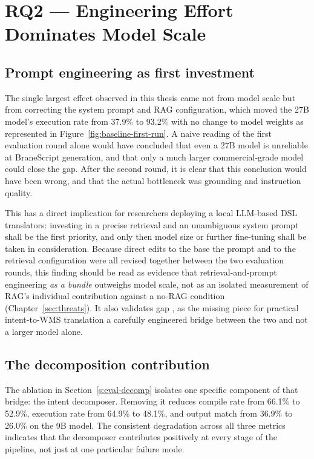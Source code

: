\section{RQ2 --- Engineering Effort Dominates Model Scale}\label{s:disc-rq2}

\subsection{Prompt engineering as first investment}

The single largest effect observed in this thesis came not from model scale but
from correcting the system prompt and RAG configuration, which moved the 27B model's
execution rate from 37.9\% to 93.2\% with no change to model weights as represented in Figure~\ref{fig:baseline-first-run}.
A naive reading of the first evaluation round alone would have concluded that
even a 27B model is unreliable at BraneScript generation, and that only a
much larger commercial-grade model could close the gap. After the second round,
it is clear that this conclusion would have been wrong, and that the actual
bottleneck was grounding and instruction quality.

This has a direct implication for researchers deploying a local LLM-based
DSL translators: investing in a precise retrieval and an
unambiguous system prompt shall be the first priority, and only then model size
or further fine-tuning shall be taken in consideration.
Because direct edits to the base the prompt and to the retrieval configuration were all
revised together between the two evaluation rounds, this finding should be
read as evidence that retrieval-and-prompt engineering \emph{as a bundle}
outweighs model scale, not as an isolated measurement of RAG's individual
contribution against a no-RAG condition (Chapter~\ref{sec:threats}). It also
validates gap , as the missing piece for practical intent-to-WMS
translation a carefully engineered bridge between the two and not a larger model alone.

\subsection{The decomposition contribution}

The ablation in Section~\ref{s:eval-decomp} isolates one specific component
of that bridge: the intent decomposer. Removing it reduces compile rate from
66.1\% to 52.9\%, execution rate from 64.9\% to 48.1\%, and output match from
36.9\% to 26.0\% on the 9B model. The consistent degradation across all three
metrics indicates that the decomposer contributes positively at every stage of
the pipeline, not just at one particular failure mode.

